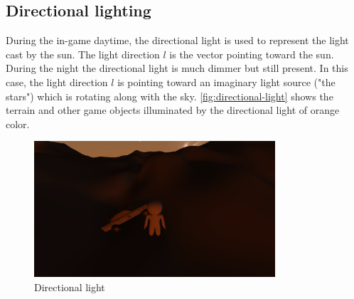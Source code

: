 \subsection{Directional lighting} \label{subsec:directional-lighting}
During the in-game daytime, the directional light is used to represent the light cast by the sun.
The light direction $l$ is the vector pointing toward the sun.
During the night the directional light is much dimmer but still present.
In this case, the light direction $l$ is pointing toward an imaginary light source ("the stars") which is rotating along with the sky.
\autoref{fig:directional-light} shows the terrain and other game objects illuminated by the directional light of orange color.
\begin{figure}[!htb]
    \centering
    \includegraphics[width=0.8\textwidth]{chapters/theoretical_foundations/sections/lighting/resources/directional-light.png}
    \caption{Directional light}
    \label{fig:directional-light}
\end{figure}